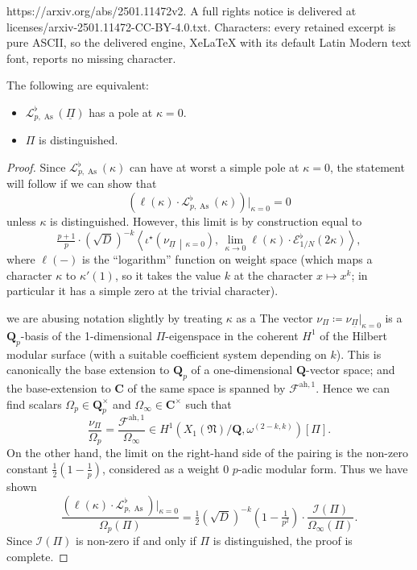 \documentclass[10pt,a4paper]{amsart}
\DeclareMathOperator{\As}{As}
\newcommand{\CC}{\mathbf{C}}
\newcommand{\QQ}{\mathbf{Q}}
\newcommand{\Qp}{\QQ_p}
\newcommand{\ah}{\mathrm{ah}}
\newcommand{\cE}{\mathcal{E}}
\newcommand{\cF}{\mathcal{F}}
\newcommand{\cL}{\mathcal{L}}
\newcommand{\uPi}{\underline{\Pi}}
\begin{document}
https://arxiv.org/abs/2501.11472v2. A full rights notice is delivered at licenses/arxiv-2501.11472-CC-BY-4.0.txt. Characters: every retained excerpt is pure ASCII, so the delivered engine, XeLaTeX with its default Latin Modern text font, reports no missing character.
 \begin{theorem}
  \label{thm:nopole}
  The following are equivalent:
  \begin{itemize}
   \item $\cL^\flat_{p,\As}(\uPi)$ has a pole at $\kappa = 0$.
   \item $\Pi$ is distinguished.
  \end{itemize}
 \end{theorem}

 \begin{proof}
  Since  $\cL^\flat_{p,\As}(\kappa)$ can have at worst a simple pole at $\kappa=0$, the statement will follow if we can show that
  \[ \left(\ell(\kappa) \cdot \cL^\flat_{p,\As}(\kappa)\right)|_{\kappa=0}=0\]
  unless $\kappa$ is distinguished. However, this limit is by construction equal to
  \[
   \tfrac{p + 1}{p} \cdot (\sqrt{D})^{-k} \left\langle \iota^\star\left(\nu_{\underline{\Pi}}\middle|_{\kappa = 0}\right),\,
   \lim_{\kappa \to 0} \ell(\kappa) \cdot \cE^{\flat}_{1/N}(2\kappa) \right\rangle, \]
  where $\ell(-)$ is the ``logarithm'' function on weight space (which maps a character $\kappa$ to $\kappa'(1)$, so it takes the value $k$ at the character $x \mapsto x^k$; in particular it has a simple zero at the trivial character).
  
  
  we are abusing notation slightly by treating $\kappa$ as a 
  The vector $\nu_\Pi \coloneqq \nu_{\underline{\Pi}}|_{\kappa = 0}$ is a $\Qp$-basis of the 1-dimensional $\Pi$-eigenspace in the coherent $H^1$ of the Hilbert modular surface (with a suitable coefficient system depending on $k$). This is canonically the base extension to $\Qp$ of a one-dimensional $\QQ$-vector space; and the base-extension to $\CC$ of the same space is spanned by $\cF^{\ah, 1}$. Hence we can find scalars $\Omega_p \in \Qp^\times$ and $\Omega_\infty \in \CC^\times$ such that
  \[
   \frac{\nu_\Pi}{\Omega_p} = \frac{\cF^{\mathrm{ah}, 1}}{\Omega_\infty} \in H^1(X_1(\mathfrak{N}) / \QQ, \omega^{(2-k, k)})[\Pi].
  \]
  On the other hand, the limit on the right-hand side of the pairing is the non-zero constant $\tfrac{1}{2}\left(1 - \tfrac{1}{p}\right)$, considered as a weight 0 $p$-adic modular form. Thus we have shown
  \[ \frac{\left(\ell(\kappa) \cdot \cL^\flat_{p,\As}\right)|_{\kappa=0}}{\Omega_p(\Pi)} = \tfrac{1}{2} (\sqrt{D})^{-k} \left(1 - \tfrac{1}{p^2}\right)\cdot \frac{\mathcal{I}(\Pi)}{\Omega_\infty(\Pi)}. \]
  Since $\mathcal{I}(\Pi)$ is non-zero if and only if $\Pi$ is distinguished, the proof is complete.
 \end{proof}
\end{document}
